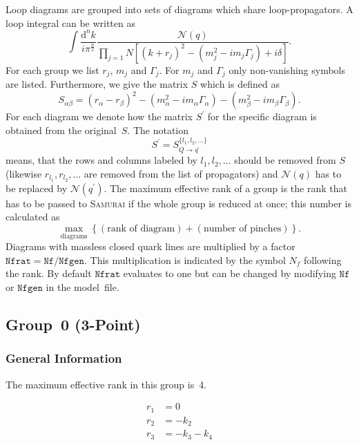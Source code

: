 \documentclass[a4paper]{article}
\begin{document}
Loop diagrams are grouped into sets of diagrams which share
loop-propagators. A loop integral can be written as
\begin{equation}
\int\!\frac{\mathrm{d}^nk}{i\pi^{\frac{n}{2}}}%
\frac{\mathcal{N}(q)}{\prod_{j=1}{N}\left[(k+r_j)^2-(m_j^2
   -i m_j\Gamma_j) + i\delta\right]}.
\end{equation}
For each group we list $r_j$, $m_j$ and $\Gamma_j$.
For $m_j$ and $\Gamma_j$ only non-vanishing symbols are listed.
Furthermore, we give the matrix $S$ which is defined as
\begin{equation}
S_{\alpha\beta} = (r_\alpha-r_\beta)^2
-(m_\alpha^2-im_\alpha\Gamma_\alpha)
-(m_\beta^2-im_\beta\Gamma_\beta).
\end{equation}
For each diagram we denote how the matrix $S^\prime$ for the specific diagram
is obtained from the original~$S$. The notation
\begin{equation}
S^\prime=S_{Q\to q^\prime}^{\{l_1,l_2,\ldots\}}
\end{equation}
means, that the rows and columns labeled by $l_1,l_2,\ldots$ should be
removed from $S$ (likewise $r_{l_1}, r_{l_2}, \ldots$ are removed from the
list of propagators) and $\mathcal{N}(q)$ has to be replaced by
$\mathcal{N}(q^\prime)$.
The maximum effective rank of a group is the rank that has to be passed
to \textsc{Samurai} if the whole group is reduced at once; this number
is calculated as
\begin{equation}
\max_{\text{diagrams}}\left\{(\text{rank of diagram})+
(\text{number of pinches})\right\}.
\end{equation}
Diagrams with massless closed quark lines are multiplied by a factor
$\mathtt{Nfrat}=\mathtt{Nf}/\mathtt{Nfgen}$. This multiplication is indicated
by the symbol $N_f$ following the rank. By default $\mathtt{Nfrat}$ evaluates
to one but can be changed by modifying $\mathtt{Nf}$ or $\mathtt{Nfgen}$ in the
model~file.


\subsection{Group~0 (3-Point)}
\subsubsection*{General Information}
The maximum effective rank in this group is~4.

\begin{subequations}
\begin{align}
r_{1} &= 0\\
r_{2} &= -k_{2}\\
r_{3} &= -k_{3}-k_{4}
\end{align}
\end{subequations}
\end{document}
